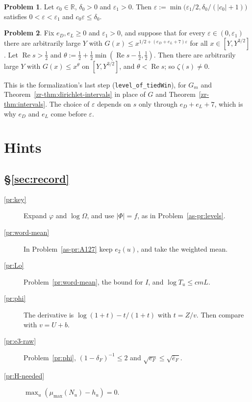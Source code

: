 \documentclass[reqno]{amsart}
\theoremstyle{definition}
\newtheorem{problem}{Problem}[section]
\theoremstyle{plain}
\newcommand{\mumax}{\mu_{\max}}
\newcommand{\tl}[1]{\texttt{#1}}
\renewcommand{\Re}{\operatorname{Re}}
\begin{document}
\begin{problem}\label{pr:small-eps}
Let \(c_0 \in \mathbb R\), \(\delta_0 > 0\) and \(\varepsilon_1 > 0\).  Then \(\varepsilon := \min\bigl(\varepsilon_1/2, \delta_0/(\lvert c_0\rvert + 1)\bigr)\) satisfies \(0 < \varepsilon < \varepsilon_1\) and \(c_0\varepsilon \le \delta_0\).
\end{problem}

\begin{problem}\label{pr:zero-free}
Fix \(e_D, e_L \ge 0\) and \(\varepsilon_1 > 0\), and suppose that for every \(\varepsilon \in (0, \varepsilon_1)\) there are arbitrarily large \(Y\) with \(G(x) \le x^{1/2+(e_D+e_L+7)\varepsilon}\) for all \(x \in [Y, Y^{3/2}]\).  Let \(\Re s > \frac12\) and \(\theta := \frac12 + \frac12\min(\Re s - \frac12, \frac12)\).  Then there are arbitrarily large \(Y\) with \(G(x) \le x^\theta\) on \([Y, Y^{3/2}]\), and \(\theta < \Re s\); so \(\zeta(s) \ne 0\).
\end{problem}

This is the formalization's last step (\tl{level\_of\_tiedWin}), for \(G_m\) and Theorem~\ref{zr-thm:dirichlet-intervals} in place of \(G\) and Theorem~\ref{zr-thm:intervals}.  The choice of \(\varepsilon\) depends on \(s\) only through \(e_D + e_L + 7\), which is why \(e_D\) and \(e_L\) come before \(\varepsilon\).

\section*{Hints}

\subsection*{\S\ref{sec:record}}
\begin{description}
\item[\ref{pr:key}] Expand \(\varphi\) and \(\log\Omega\), and use \(\lvert\Phi\rvert = f\), as in Problem~\ref{as-pr:levels}.
\item[\ref{pr:word-mean}] In Problem~\ref{as-pr:A127} keep \(e_2(u)\), and take the weighted mean.
\item[\ref{pr:Lo}] Problem~\ref{pr:word-mean}, the bound for \(I\), and \(\log T_u \le cmL\).
\item[\ref{pr:phi}] The derivative is \(\log(1 + t) - t/(1 + t)\) with \(t = Z/v\).  Then compare with \(v = U + b\).
\item[\ref{pr:e3-raw}] Problem~\ref{pr:phi}, \((1 - \delta_F)^{-1} \le 2\) and \(\sqrt{e_F} \le \sqrt{\bar e_F}\).
\item[\ref{pr:H-needed}] \(\max_u(\mumax(N_u) - h_u) = 0\).
\end{description}
\end{document}
